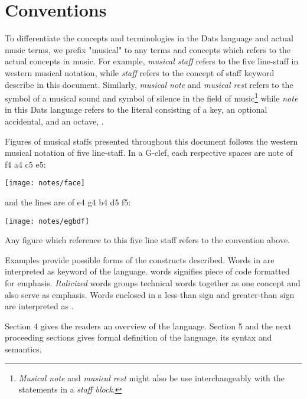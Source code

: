 \section{Conventions}

\np To differentiate the concepts and terminologies in the Dats language and
actual music terms, we prefix "musical" to any terms and concepts which
refers to the actual concepts in music. For example, \textit{musical staff} refers
to the five line-staff in western musical notation, while \textit{staff} refers to
the concept of staff keyword describe in this document. Similarly,
\textit{musical note} and \textit{musical rest} refers to the symbol of a musical
sound and symbol of silence in the field of music\footnote{\textit{Musical note} and
\textit{musical rest} might also be use interchangeably with the statements in a
\textit{staff block}.} while \textit{note} in this Dats language refers to the literal
consisting of a key, an optional accidental, and an octave, \protect{}.
 
\np Figures of musical staffs presented throughout this document follows the
western musical notation of five line-staff. In a G-clef, each respective
spaces are note of f4 a4 c5 e5:

\begin{center}
\texttt{[image: notes/face]}
\end{center}

and the lines are of e4 g4 b4 d5 f5:

\begin{center}
\texttt{[image: notes/egbdf]}
\end{center}

Any figure which reference to this five line staff refers to the convention above.

\np Examples provide possible forms of the constructs described. Words in 
are interpreted as keyword of the language.  words signifies piece of code 
formatted for emphasis.  \textit{Italicized} words groups technical words together as one
concept and also serve as emphasis. Words enclosed in a less-than sign and greater-than sign are
interpreted as .

Section 4 gives the readers an overview of the language. Section 5 and the next proceeding sections
gives formal definition of the language, its syntax and semantics.



